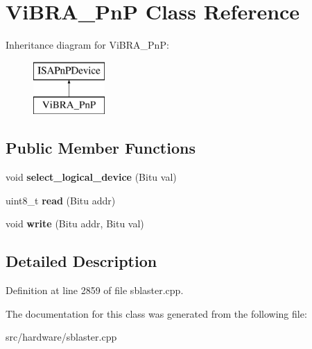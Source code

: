 \hypertarget{classViBRA__PnP}{\section{Vi\-B\-R\-A\-\_\-\-Pn\-P Class Reference}
\label{classViBRA__PnP}
}
Inheritance diagram for Vi\-B\-R\-A\-\_\-\-Pn\-P\-:\begin{figure}[H]
\begin{center}
\leavevmode
\includegraphics[height=2.000000cm]{classViBRA__PnP}
\end{center}
\end{figure}
\subsection*{Public Member Functions}
\begin{DoxyCompactItemize}
\item 
\hypertarget{classViBRA__PnP_ad5d0a168bbb86f72c44255c0b065ec1a}{void {\bfseries select\-\_\-logical\-\_\-device} (Bitu val)}\label{classViBRA__PnP_ad5d0a168bbb86f72c44255c0b065ec1a}

\item 
\hypertarget{classViBRA__PnP_ac467093f48f75b421715ebd10a676f05}{uint8\-\_\-t {\bfseries read} (Bitu addr)}\label{classViBRA__PnP_ac467093f48f75b421715ebd10a676f05}

\item 
\hypertarget{classViBRA__PnP_a9d6d3c3ad0a64c68a222f93ee3a30f31}{void {\bfseries write} (Bitu addr, Bitu val)}\label{classViBRA__PnP_a9d6d3c3ad0a64c68a222f93ee3a30f31}

\end{DoxyCompactItemize}


\subsection{Detailed Description}


Definition at line 2859 of file sblaster.\-cpp.



The documentation for this class was generated from the following file\-:\begin{DoxyCompactItemize}
\item 
src/hardware/sblaster.\-cpp\end{DoxyCompactItemize}

